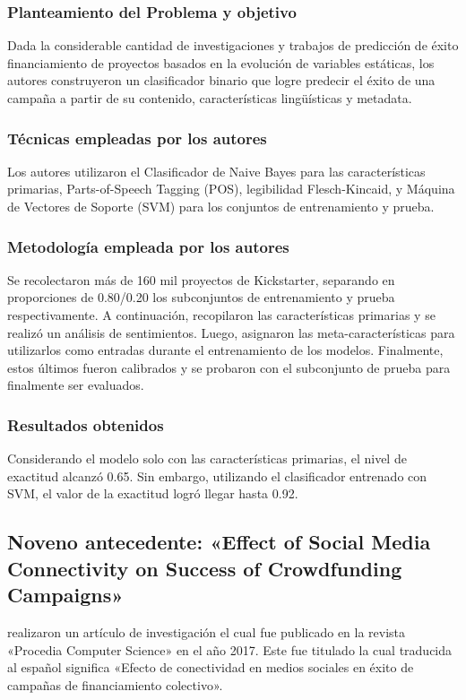 \subsubsection{Planteamiento del Problema y objetivo}
Dada la considerable cantidad de investigaciones y trabajos de predicción de éxito financiamiento de proyectos basados en la evolución de variables estáticas, los autores construyeron un clasificador binario que logre predecir el éxito de una campaña a partir de su contenido, características lingüísticas y metadata.

\subsubsection{Técnicas empleadas por los autores}
Los autores utilizaron el Clasificador de Naive Bayes para las características primarias, Parts-of-Speech Tagging (POS), legibilidad Flesch-Kincaid, y Máquina de Vectores de Soporte (SVM) para los conjuntos de entrenamiento y prueba.

\subsubsection{Metodología empleada por los autores}
Se recolectaron más de 160 mil proyectos de Kickstarter, separando en proporciones de 0.80/0.20 los subconjuntos de entrenamiento y prueba respectivamente. A continuación, recopilaron las características primarias y se realizó un análisis de sentimientos. Luego, asignaron las meta-características para utilizarlos como entradas durante el entrenamiento de los modelos. Finalmente, estos últimos fueron calibrados y se probaron con el subconjunto de prueba para finalmente ser evaluados.

\subsubsection{Resultados obtenidos}
Considerando el modelo solo con las características primarias, el nivel de exactitud alcanzó 0.65. Sin embargo, utilizando el clasificador entrenado con SVM, el valor de la exactitud logró llegar hasta 0.92.

\subsection{Noveno antecedente: «Effect of Social Media Connectivity on Success of Crowdfunding Campaigns» \citep*{pr_kaur2017socmedcrowd}}
\citeauthor{pr_kaur2017socmedcrowd} realizaron un artículo de investigación el cual fue publicado en la revista «Procedia Computer Science» en el año 2017. Este fue titulado  la cual traducida al español significa «Efecto de conectividad en medios sociales en éxito de campañas de financiamiento colectivo».

